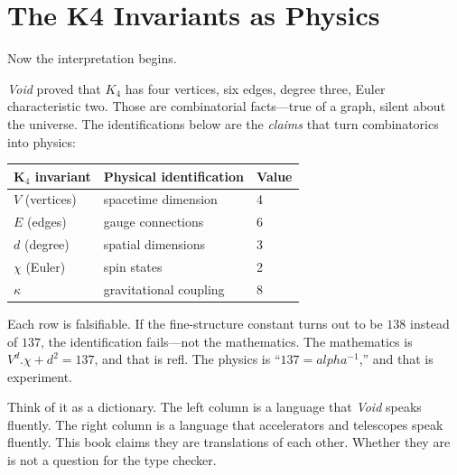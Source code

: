 \documentclass[11pt,a4paper]{book}
\def\alpha{alpha}%
\def\cdot{.}%
\def\texttt#1{#1}%
\def\texorpdfstring#1#2{#2}%
\begin{document}
\section{The K\texorpdfstring{$_4$}{4} Invariants as Physics}

Now the interpretation begins.

\textit{Void} proved that $K_4$ has four vertices, six edges, degree three, Euler characteristic two. Those are combinatorial facts---true of a graph, silent about the universe. The identifications below are the \emph{claims} that turn combinatorics into physics:

\begin{center}
\begin{tabular}{lll}
\toprule
\textbf{K$_4$ invariant} & \textbf{Physical identification} & \textbf{Value} \\
\midrule
$V$ (vertices) & spacetime dimension & 4 \\
$E$ (edges)    & gauge connections   & 6 \\
$d$ (degree)   & spatial dimensions  & 3 \\
$\chi$ (Euler) & spin states         & 2 \\
$\kappa$       & gravitational coupling & 8 \\
\bottomrule
\end{tabular}
\end{center}

Each row is falsifiable. If the fine-structure constant turns out to be $138$ instead of $137$, the identification fails---not the mathematics. The mathematics is $V^d \cdot \chi + d^2 = 137$, and that is \texttt{refl}. The physics is ``$137 = \alpha^{-1}$,'' and that is experiment.

Think of it as a dictionary. The left column is a language that \textit{Void} speaks fluently. The right column is a language that accelerators and telescopes speak fluently. This book claims they are translations of each other. Whether they are is not a question for the type checker.
\end{document}
